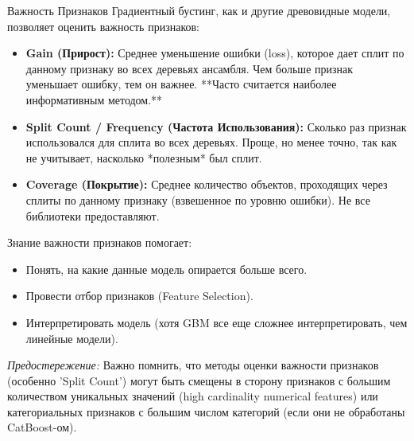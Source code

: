 \begin{myexampleblock}{Важность Признаков}
    Градиентный бустинг, как и другие древовидные модели, позволяет оценить важность признаков:
    \begin{itemize}
        \item \textbf{Gain (Прирост):} Среднее уменьшение ошибки (loss), которое дает сплит по данному признаку во всех деревьях ансамбля. Чем больше признак уменьшает ошибку, тем он важнее. **Часто считается наиболее информативным методом.**
        \item \textbf{Split Count / Frequency (Частота Использования):} Сколько раз признак использовался для сплита во всех деревьях. Проще, но менее точно, так как не учитывает, насколько *полезным* был сплит.
        \item \textbf{Coverage (Покрытие):} Среднее количество объектов, проходящих через сплиты по данному признаку (взвешенное по уровню ошибки). Не все библиотеки предоставляют.
    \end{itemize}
    Знание важности признаков помогает:
    \begin{itemize}
        \item Понять, на какие данные модель опирается больше всего.
        \item Провести отбор признаков (Feature Selection).
        \item Интерпретировать модель (хотя GBM все еще сложнее интерпретировать, чем линейные модели).
    \end{itemize}
    \vspace{1ex} %
    \textit{Предостережение:} Важно помнить, что методы оценки важности признаков (особенно 'Split Count') могут быть смещены в сторону признаков с большим количеством уникальных значений (high cardinality numerical features) или категориальных признаков с большим числом категорий (если они не обработаны CatBoost-ом). %
\end{myexampleblock}

